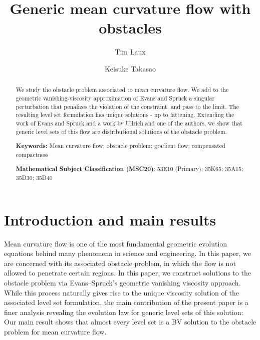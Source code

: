 \documentclass{amsart}
\title{Generic mean curvature flow with obstacles}
\author{Tim Laux}
\author{Keisuke Takasao}
\theoremstyle{definition}
\begin{document}
\maketitle

\begin{abstract}
    We study the obstacle problem associated to mean curvature flow. 
    We add to the geometric vanishing-viscosity approximation of Evans and Spruck a singular perturbation that penalizes the violation of the constraint, and pass to the limit. 
    The resulting level set formulation has unique solutions - up to fattening. 
    Extending the work of Evans and Spruck and a work by Ullrich and one of the authors, we show that generic level sets of this flow are distributional solutions of the obstacle problem.
    
    \medskip
    
     \noindent \textbf{Keywords:} Mean curvature flow; obstacle problem; gradient flow; compensated compactness

     \medskip
  
    \noindent \textbf{Mathematical Subject Classification (MSC20)}: 
    53E10 (Primary); %
    35K65; %
    35A15; %
    35D30; %
    35D40 %
    
\end{abstract}

\section{Introduction and main results}

Mean curvature flow is one of the most fundamental geometric evolution equations behind many phenomena in science and engineering. 
In this paper, we are concerned with its associated obstacle problem, in which the flow is not allowed to penetrate certain regions.
In this paper, we construct solutions to the obstacle problem via Evans--Spruck's geometric vanishing viscosity approach. 
While this process naturally gives rise to the unique viscosity solution of the associated level set formulation, the main contribution of the present paper is a finer analysis revealing the evolution law for generic level sets of this solution:
Our main result shows that almost every level set is a BV solution to the obstacle problem for mean curvature flow.
\end{document}
